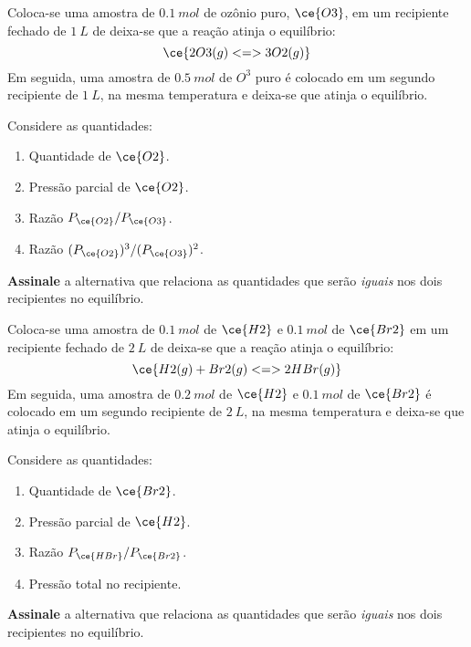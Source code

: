 \begin{problem}[
	id={2F09},
	path={/home/braun/Documents/Developer/braunchem/data/problems/Q2/2F/2F09}
]
Coloca-se uma amostra de {\(\qty{0,1}{\unit{mol}}\)} de ozônio puro, {\(\ce{O3}\)}, em um recipiente fechado de {\(\qty{1}{\unit{L}}\)} de deixa-se
que a reação atinja o equilíbrio: {\[
    \ce{ 2 O3(g) <=> 3 O2(g) }
\]} Em seguida, uma amostra de {\(\qty{0,5}{\unit{mol}}\)} de {\(\unit{O^{3}}\)} puro é colocado em um segundo recipiente de {\(\qty{1}{\unit{L}}\)},
na mesma temperatura e deixa-se que atinja o equilíbrio.

Considere as quantidades:

\begin{enumerate}
\def\labelenumi{\arabic{enumi}.}
\tightlist
\item
  Quantidade de {\(\ce{O2}\)}.
\item
  Pressão parcial de {\(\ce{O2}\)}.
\item
  Razão {\(P_{\ce{O2}}/P_{\ce{O3}}\)}.
\item
  Razão {\((P_{\ce{O2}})^3/(P_{\ce{O3}})^2\)}.
\end{enumerate}

\textbf{Assinale} a alternativa que relaciona as quantidades que serão \emph{iguais} nos dois recipientes no equilíbrio.
\end{problem}


\begin{problem}[
	id={2F10},
	path={/home/braun/Documents/Developer/braunchem/data/problems/Q2/2F/2F10}
]
Coloca-se uma amostra de {\(\qty{0,1}{\unit{mol}}\)} de {\(\ce{H2}\)} e {\(\qty{0,1}{\unit{mol}}\)} de {\(\ce{Br2}\)} em um recipiente fechado de
{\(\qty{2}{\unit{L}}\)} de deixa-se que a reação atinja o equilíbrio: {\[
    \ce{ H2(g) + Br2(g) <=> 2 HBr(g) }
\]} Em seguida, uma amostra de {\(\qty{0,2}{\unit{mol}}\)} de {\(\ce{H2}\)} e {\(\qty{0,1}{\unit{mol}}\)} de {\(\ce{Br2}\)} é colocado em um segundo
recipiente de {\(\qty{2}{\unit{L}}\)}, na mesma temperatura e deixa-se que atinja o equilíbrio.

Considere as quantidades:

\begin{enumerate}
\def\labelenumi{\arabic{enumi}.}
\tightlist
\item
  Quantidade de {\(\ce{Br2}\)}.
\item
  Pressão parcial de {\(\ce{H2}\)}.
\item
  Razão {\(P_{\ce{HBr}}/P_{\ce{Br2}}\)}.
\item
  Pressão total no recipiente.
\end{enumerate}

\textbf{Assinale} a alternativa que relaciona as quantidades que serão \emph{iguais} nos dois recipientes no equilíbrio.
\end{problem}


